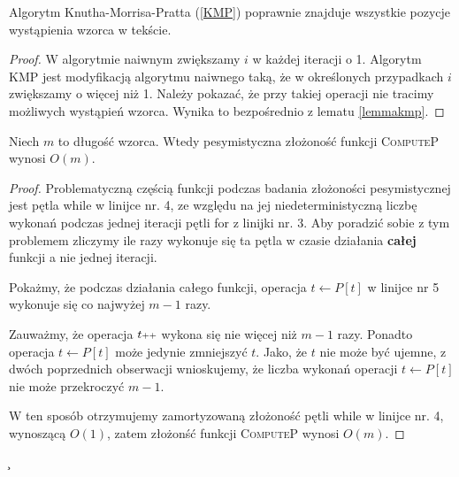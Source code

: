 \begin{theorem}
	Algorytm Knutha-Morrisa-Pratta (\ref{KMP}) poprawnie znajduje wszystkie pozycje wystąpienia wzorca w tekście. 
	\begin{proof}
		W algorytmie naiwnym zwiększamy $i$ w każdej iteracji o 1. Algorytm KMP jest modyfikacją algorytmu naiwnego taką, że w określonych przypadkach $i$ zwiększamy o więcej niż 1. Należy pokazać, że przy takiej operacji nie tracimy możliwych wystąpień wzorca. Wynika to bezpośrednio z lematu \ref{lemmakmp}.
	\end{proof}
\end{theorem}

\begin{lemma}
	\label{zlozonoscComputeP}
	Niech $m$ to długość wzorca. Wtedy pesymistyczna złożoność funkcji \textsc{ComputeP} wynosi $O(m)$.
	\begin{proof}
		Problematyczną częścią funkcji podczas badania złożoności pesymistycznej jest pętla while w linijce nr. 4, 
		ze względu na jej niedeterministyczną liczbę wykonań podczas jednej iteracji pętli for z linijki nr. 3. Aby poradzić sobie z tym problemem zliczymy ile razy wykonuje się ta pętla
		w czasie działania \textbf{całej} funkcji a nie jednej iteracji.
		 
		Pokażmy, że podczas działania całego funkcji, operacja $t \gets P[t]$ w linijce nr 5 wykonuje się co najwyżej $m-1$ razy.
		
		Zauważmy, że operacja $t\scalebox{0.75}{++}$ wykona się nie więcej niż $m-1$ razy.
		Ponadto operacja $t \gets P[t]$ może jedynie zmniejszyć $t$. Jako, że $t$ nie może
		być ujemne, z dwóch poprzednich obserwacji wnioskujemy, że
		liczba wykonań operacji $t \gets P[t]$ nie może przekroczyć $m-1$.
		
		W ten sposób otrzymujemy zamortyzowaną złożoność pętli while w linijce nr. 4,
		wynoszącą $O(1)$, zatem złożonść funkcji \textsc{ComputeP} wynosi $O(m)$.
		
	\end{proof}	
	\c
\end{lemma}


